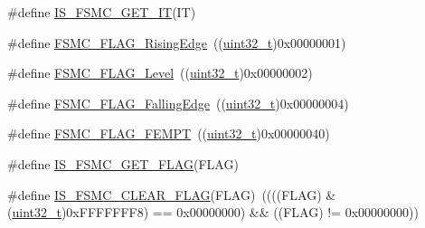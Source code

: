 \begin{DoxyCompactItemize}
\#define \hyperlink{group___f_s_m_c___interrupt__sources_gae2a57d0b15e025212489ec1421ff245d}{I\+S\+\_\+\+F\+S\+M\+C\+\_\+\+G\+E\+T\+\_\+\+IT}(IT)
\item 
\#define \hyperlink{group___f_s_m_c___flags_ga5aadbd5d9f1b6a25bcc1fc6f3bf4c9cc}{F\+S\+M\+C\+\_\+\+F\+L\+A\+G\+\_\+\+Rising\+Edge}~((\hyperlink{_p_e___types_8h_a33594304e786b158f3fb30289278f5af}{uint32\+\_\+t})0x00000001)
\item 
\#define \hyperlink{group___f_s_m_c___flags_ga25868d35780998a52190c424ebb3823f}{F\+S\+M\+C\+\_\+\+F\+L\+A\+G\+\_\+\+Level}~((\hyperlink{_p_e___types_8h_a33594304e786b158f3fb30289278f5af}{uint32\+\_\+t})0x00000002)
\item 
\#define \hyperlink{group___f_s_m_c___flags_gaaaa85bce06ed962874686ad7af0f0cb7}{F\+S\+M\+C\+\_\+\+F\+L\+A\+G\+\_\+\+Falling\+Edge}~((\hyperlink{_p_e___types_8h_a33594304e786b158f3fb30289278f5af}{uint32\+\_\+t})0x00000004)
\item 
\#define \hyperlink{group___f_s_m_c___flags_ga8da2bd0b9d11877aaebaba0c77e8b0cc}{F\+S\+M\+C\+\_\+\+F\+L\+A\+G\+\_\+\+F\+E\+M\+PT}~((\hyperlink{_p_e___types_8h_a33594304e786b158f3fb30289278f5af}{uint32\+\_\+t})0x00000040)
\item 
\#define \hyperlink{group___f_s_m_c___flags_gab8674160ef7884f939e07041bbf5b18b}{I\+S\+\_\+\+F\+S\+M\+C\+\_\+\+G\+E\+T\+\_\+\+F\+L\+AG}(F\+L\+AG)
\item 
\#define \hyperlink{group___f_s_m_c___flags_ga1114bf56b54e726831b38fc8c5daa14e}{I\+S\+\_\+\+F\+S\+M\+C\+\_\+\+C\+L\+E\+A\+R\+\_\+\+F\+L\+AG}(F\+L\+AG)~((((F\+L\+AG) \& (\hyperlink{_p_e___types_8h_a33594304e786b158f3fb30289278f5af}{uint32\+\_\+t})0x\+F\+F\+F\+F\+F\+F\+F8) == 0x00000000) \&\& ((\+F\+L\+A\+G) != 0x00000000))
\end{DoxyCompactItemize}

